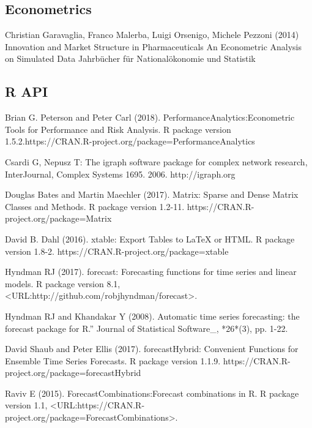 \subsection{Econometrics}

 Christian Garavaglia, Franco Malerba, Luigi Orsenigo, Michele Pezzoni (2014)
\newblock Innovation and Market Structure in Pharmaceuticals An Econometric Analysis on Simulated Data
\newblock Jahrbücher für Nationalökonomie und Statistik 

\subsection{R API}

 Brian G. Peterson and Peter Carl (2018). 
\newblock PerformanceAnalytics:Econometric Tools for Performance and Risk Analysis. 
\newblock R package version 1.5.2.https://CRAN.R-project.org/package=PerformanceAnalytics

Csardi G, Nepusz T: 
\newblock The igraph software package for complex network research,
\newblock InterJournal, Complex Systems 1695. 2006. http://igraph.org

Douglas Bates and Martin Maechler (2017). 
\newblock Matrix: Sparse and Dense Matrix Classes and Methods. 
\newblock R package version 1.2-11. https://CRAN.R-project.org/package=Matrix

David B. Dahl (2016). 
\newblock xtable: Export Tables to LaTeX or HTML. 
\newblock R package version 1.8-2. https://CRAN.R-project.org/package=xtable

Hyndman RJ (2017). 
\newblock forecast: Forecasting functions for time series and linear models. 
\newblock R package version 8.1, <URL:http://github.com/robjhyndman/forecast>.

Hyndman RJ and Khandakar Y (2008).
\newblock Automatic time series forecasting: the forecast package for R.” 
\newblock Journal of Statistical Software_, *26*(3), pp. 1-22.

David Shaub and Peter Ellis (2017).
\newblock forecastHybrid: Convenient Functions for Ensemble Time Series Forecasts. 
\newblock R package version 1.1.9. https://CRAN.R-project.org/package=forecastHybrid

Raviv E (2015). 
\newblock ForecastCombinations:Forecast combinations in R. 
\newblock R package version 1.1, <URL:https://CRAN.R-project.org/package=ForecastCombinations>.

